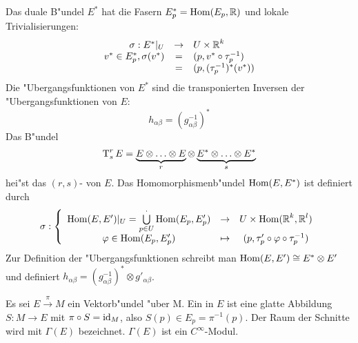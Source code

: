 Das duale B"undel $E^*$ hat die Fasern $E_p^* = \operatorname{Hom}(E_p, \operatorname{\mathbb{R}})$ und lokale Trivialisierungen:
	\[ \begin{array}{rcl} \sigma: E^*|_U &\to& U \times \operatorname{\mathbb{R}}^k\\
	v^* \in E^*_p, \sigma(v^*) &=& (p, v^* \circ \tau_p^{-1}) \\
	&=& (p, (\tau_p^{-1})^*(v^*)) \end{array}\]
Die "Ubergangsfunktionen von $E^*$ sind die transponierten Inversen der "Ubergangsfunktionen von $E$:
	\[ h_{\alpha\beta} = (g_{\alpha\beta}^{-1})^* \]
Das B"undel
	\[ \operatorname{T}_s^r E = \underbrace{E \otimes \ldots \otimes E}_{r} \otimes \underbrace{E^* \otimes \ldots \otimes E^*}_{s} \]
hei"st das $(r,s)$- von $E$. Das Homomorphismenb"undel $\operatorname{Hom}(E,E^*)$ ist definiert durch
	\[ \sigma: \left\{ \begin{array}{ccc} \operatorname{Hom}(E,E')|_U = \bigcup\limits_{p \in U}^{\cdot} \operatorname{Hom}(E_p, E_p') &\to& U \times \operatorname{Hom}(\operatorname{\mathbb{R}}^k, \operatorname{\mathbb{R}}^l)\\
		\varphi \in \operatorname{Hom}(E_p, E'_p) &\mapsto& (p, \tau'_p \circ \varphi \circ \tau_p^{-1}) \end{array} \right. \]
Zur Definition der "Ubergangsfunktionen schreibt man $\operatorname{Hom}(E, E') \cong E^* \otimes E'$ und definiert $h_{\alpha\beta} = (g_{\alpha\beta}^{-1})^* \otimes g'_{\alpha\beta}$.
\begin{center}\end{center}

\begin{Dfn}
Es sei $E \xrightarrow{\pi} M$ ein Vektorb"undel "uber M. Ein  in $E$ ist eine glatte Abbildung $S: M \to E$ mit $\pi \circ S = \operatorname{id}_M$, also $S(p) \in E_p = \pi^{-1}(p)$. Der Raum der Schnitte wird mit $\Gamma(E)$ bezeichnet. $\Gamma(E)$ ist ein $C^{\infty}$-Modul.
\end{Dfn}



